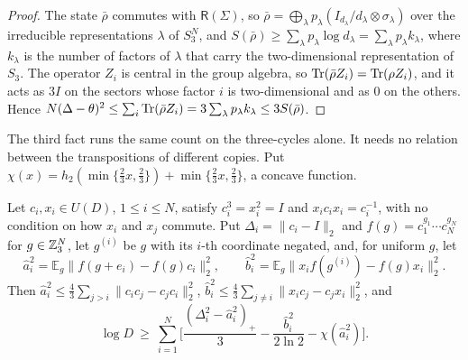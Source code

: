 \begin{proof}
The state $\bar\rho$ commutes with $\mathsf R(\Sigma)$, so $\bar\rho=\bigoplus_\lambda p_\lambda(I_{d_\lambda}/d_\lambda\otimes\sigma_\lambda)$ over the
irreducible representations $\lambda$ of $S_3^N$, and $S(\bar\rho)\ge\sum_\lambda p_\lambda\log d_\lambda=\sum_\lambda p_\lambda k_\lambda$, where $k_\lambda$
is the number of factors of $\lambda$ that carry the two-dimensional representation of $S_3$. The operator $Z_i$ is central in the group
algebra, so $\operatorname{Tr}(\bar\rho Z_i)=\operatorname{Tr}(\rho Z_i)$, and it acts as $3I$ on the sectors whose factor $i$ is two-dimensional and as $0$ on the others.
Hence $N(\Delta-\theta)^2\le\sum_i\operatorname{Tr}(\bar\rho Z_i)=3\sum_\lambda p_\lambda k_\lambda\le3S(\bar\rho)$.
\end{proof}

The third fact runs the same count on the three-cycles alone. It needs no relation between the transpositions of different copies. Put
$\chi(x)=h_2(\min\{\frac23x,\frac23\})+\min\{\frac23x,\frac23\}$, a concave function.

\begin{theorem}\label{thm:imp-phase}
Let $c_i,x_i\in U(D)$, $1\le i\le N$, satisfy $c_i^3=x_i^2=I$ and $x_ic_ix_i=c_i^{-1}$, with no condition on how $x_i$ and $x_j$ commute. Put
$\Delta_i=\|c_i-I\|_2$ and $f(g)=c_1^{g_1}\cdots c_N^{g_N}$ for $g\in\mathbb Z_3^N$, let $g^{(i)}$ be $g$ with its $i$-th coordinate negated, and, for
uniform $g$, let
\[
\hat a_i^2=\mathbb E_g\|f(g+e_i)-f(g)c_i\|_2^2,\qquad \hat b_i^2=\mathbb E_g\|x_if(g^{(i)})-f(g)x_i\|_2^2 .
\]
Then $\hat a_i^2\le\frac43\sum_{j>i}\|c_ic_j-c_jc_i\|_2^2$, $\hat b_i^2\le\frac43\sum_{j\ne i}\|x_ic_j-c_jx_i\|_2^2$, and
\[
\log D\ \ge\ \sum_{i=1}^N\Big[\frac{(\Delta_i^2-\hat a_i^2)_+}3-\frac{\hat b_i^2}{2\ln2}-\chi(\hat a_i^2)\Big].
\]
\end{theorem}

